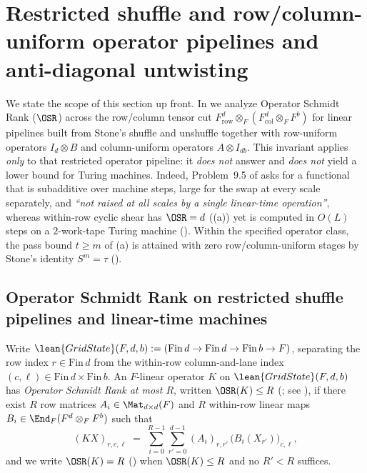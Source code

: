 \section{Restricted shuffle and row/column-uniform operator pipelines and anti-diagonal untwisting}\label{sec:duality}

We state the scope of this section up front. In  we analyze Operator Schmidt Rank
($\OSR$) across the row/column tensor cut $F_{\mathrm{row}}^d \otimes_F (F_{\mathrm{col}}^d \otimes_F F^b)$
for linear pipelines built from Stone's shuffle and unshuffle \cite{Stone1971} together with
row-uniform operators $I_d \otimes B$ and column-uniform operators $A \otimes I_{db}$. This invariant
applies \emph{only} to that restricted operator pipeline: it \emph{does not} answer
\cite[Problem~9.5]{SeventeenthPaper2026} and \emph{does not} yield a lower bound for Turing machines.
Indeed, Problem~9.5 of \cite{SeventeenthPaper2026} asks for a functional that is subadditive over
machine steps, large for the swap at every scale separately, and \emph{``not raised at all scales by
a single linear-time operation''}, whereas within-row cyclic shear has $\OSR = d$
((a)) yet is computed in $O(L)$ steps on a $2$-work-tape Turing machine
(). Within the specified operator class, the pass bound $t \ge m$ of
(a) is attained with zero row/column-uniform stages by Stone's identity
$S^m = \tau$ \cite{Stone1971} ().

\subsection{Operator Schmidt Rank on restricted shuffle pipelines and linear-time machines}\label{sec:osr}

Write $\lean{GridState}(F, d, b) := (\mathrm{Fin}\,d \to \mathrm{Fin}\,d \to \mathrm{Fin}\,b \to F)$,
separating the row index $r \in \mathrm{Fin}\,d$ from the within-row column-and-lane index
$(c, \ell) \in \mathrm{Fin}\,d \times \mathrm{Fin}\,b$. An $F$-linear operator $K$ on
$\lean{GridState}(F, d, b)$ has \emph{Operator Schmidt Rank at most $R$}, written $\OSR(K) \le R$
(; see \cite{Nielsen2003,Tyson2003}), if there exist $R$ row matrices
$A_i \in \Mat_{d\times d}(F)$ and $R$ within-row linear maps $B_i \in \End_F(F^d \otimes_F F^b)$ such
that
\[
  (K X)_{r,c,\ell}
  \;=\;
  \sum_{i=0}^{R-1} \sum_{r'=0}^{d-1} (A_i)_{r,r'}\,\bigl(B_i(X_{r'})\bigr)_{c,\ell},
\]
and we write $\OSR(K) = R$ () when $\OSR(K) \le R$ and no
$R' < R$ suffices.

